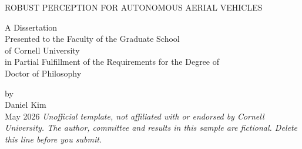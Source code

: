 \begin{titlepage}
\centering
\vspace*{1in}
\MakeUppercase{Robust Perception for Autonomous Aerial Vehicles}\par
\vspace{1.2in}
A Dissertation\\
Presented to the Faculty of the Graduate School\\
of Cornell University\\
in Partial Fulfillment of the Requirements for the Degree of\\
Doctor of Philosophy\par
\vspace{0.6in}
by\\
Daniel Kim\\
May 2026
\vfill
{\footnotesize\itshape Unofficial template, not affiliated with or endorsed by Cornell University. The author, committee and results in this sample are fictional. Delete this line before you submit.}
\end{titlepage}
